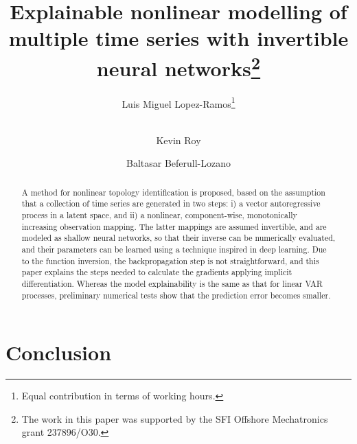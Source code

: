 \documentclass{llncs}
\makeatletter
\newcommand{\printfnsymbol}[1]{%
  \textsuperscript{\@fnsymbol{#1}}%
}
\makeatother
\begin{document}
\title{Explainable nonlinear modelling of multiple time series with invertible neural networks\thanks{
The work in this paper was supported by the SFI Offshore Mechatronics
grant 237896/O30.
}
}

\author{Luis Miguel Lopez-Ramos\thanks{Equal contribution in terms of working hours.}%
 \and
\\ 
Kevin Roy\printfnsymbol{2}%
\and
Baltasar Beferull-Lozano%
}


\maketitle

\begin{abstract}
    A method for nonlinear topology identification is proposed, based on the assumption that a collection of time series are generated in two steps: i) a vector autoregressive process in a latent space, and ii) a nonlinear, component-wise, monotonically increasing observation mapping. The latter mappings are assumed invertible, and are modeled as shallow neural networks, so that their inverse can be numerically evaluated, and their parameters can be learned using a technique inspired in deep learning. Due to the function inversion, the backpropagation step is not straightforward, and this paper explains the steps needed to calculate the gradients applying implicit differentiation. Whereas the model explainability is the same as that for linear VAR processes, preliminary numerical tests show that the prediction error becomes smaller.
\end{abstract}







\section{Conclusion}
\end{document}
